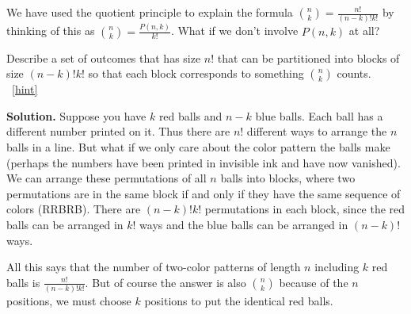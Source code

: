 \documentclass{book}
\begin{document}
\setcounter{project}{114}
\addtocounter{project}{-1}
\begin{activity}[]\label{activity-107}
\hypertarget{p-823}{}%
We have used the quotient principle to explain the formula \(\binom{n}{k} = \frac{n!}{(n-k)!k!}\) by thinking of this as \(\binom{n}{k} = \frac{P(n,k)}{k!}\).  What if we don't involve \(P(n,k)\) at all?%
\par
\hypertarget{p-824}{}%
Describe a set of outcomes that has size \(n!\) that can be partitioned into blocks of size \((n-k)!k!\) so that each block corresponds to something \(\binom{n}{k}\) counts.%
~\hfill{\tiny\hyperlink{a-114}{[hint]}\hypertarget{q-114}{}}\par\smallskip%
\noindent\textbf{Solution.}\hypertarget{solution-88}{}\quad%
\hypertarget{p-827}{}%
Suppose you have \(k\) red balls and \(n-k\) blue balls.  Each ball has a different number printed on it.  Thus there are \(n!\) different ways to arrange the \(n\) balls in a line.  But what if we only care about the color pattern the balls make (perhaps the numbers have been printed in invisible ink and have now vanished).  We can arrange these permutations of all \(n\) balls into blocks, where two permutations are in the same block if and only if they have the same sequence of colors (RRBRB\textellipsis{}).  There are \((n-k)!k!\) permutations in each block, since the red balls can be arranged in \(k!\) ways and the blue balls can be arranged in \((n-k)!\) ways.%
\par
\hypertarget{p-828}{}%
All this says that the number of two-color patterns of length \(n\) including \(k\) red balls is \(\frac{n!}{(n-k)!k!}\).  But of course the answer is also \(\binom{n}{k}\) because of the \(n\) positions, we must choose \(k\) positions to put the identical red balls.%
\end{activity}
\end{document}
